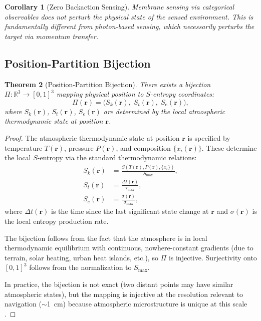 \documentclass[twocolumn,10pt]{article}
\newtheorem{theorem}{Theorem}[section]
\newtheorem{corollary}[theorem]{Corollary}
\theoremstyle{definition}
\theoremstyle{remark}
\newcommand{\Sk}{S_k}
\newcommand{\St}{S_t}
\newcommand{\Se}{S_e}
\begin{document}
\begin{corollary}[Zero Backaction Sensing]
\label{cor:zero_backaction}
Membrane sensing via categorical observables does not perturb the physical state of the sensed environment. This is fundamentally different from photon-based sensing, which necessarily perturbs the target via momentum transfer.
\end{corollary}

\subsection{Position-Partition Bijection}

\begin{theorem}[Position-Partition Bijection]
\label{thm:position_partition}
There exists a bijection $\Pi: \mathbb{R}^3 \to [0,1]^3$ mapping physical position to $S$-entropy coordinates:
\begin{equation}
  \Pi(\mathbf{r}) = \big(\Sk(\mathbf{r}),\; \St(\mathbf{r}),\; \Se(\mathbf{r})\big),
  \label{eq:position_partition}
\end{equation}
where $\Sk(\mathbf{r})$, $\St(\mathbf{r})$, $\Se(\mathbf{r})$ are determined by the local atmospheric thermodynamic state at position $\mathbf{r}$.
\end{theorem}

\begin{proof}
The atmospheric thermodynamic state at position $\mathbf{r}$ is specified by temperature $T(\mathbf{r})$, pressure $P(\mathbf{r})$, and composition $\{x_i(\mathbf{r})\}$. These determine the local $S$-entropy via the standard thermodynamic relations:
\begin{align}
  \Sk(\mathbf{r}) &= \frac{S(T(\mathbf{r}), P(\mathbf{r}), \{x_i\})}{S_{\max}}, \label{eq:sk_r} \\
  \St(\mathbf{r}) &= \frac{\Delta t(\mathbf{r})}{\tau_{\max}}, \label{eq:st_r} \\
  \Se(\mathbf{r}) &= \frac{\sigma(\mathbf{r})}{\sigma_{\max}}, \label{eq:se_r}
\end{align}
where $\Delta t(\mathbf{r})$ is the time since the last significant state change at $\mathbf{r}$ and $\sigma(\mathbf{r})$ is the local entropy production rate.

The bijection follows from the fact that the atmosphere is in local thermodynamic equilibrium with continuous, nowhere-constant gradients (due to terrain, solar heating, urban heat islands, etc.), so $\Pi$ is injective. Surjectivity onto $[0,1]^3$ follows from the normalization to $S_{\max}$.

In practice, the bijection is not exact (two distant points may have similar atmospheric states), but the mapping is injective at the resolution relevant to navigation ($\sim$\SI{1}{cm}) because atmospheric microstructure is unique at this scale \cite{sachikonye2026atmospheric}.
\end{proof}
\end{document}
